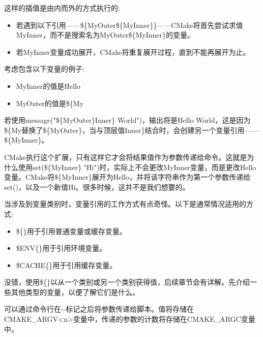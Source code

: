 这样的插值是由内而外的方式执行的:

\begin{itemize}
\item 
若遇到以下引用——\$\{MyOuter\$\{MyInner\}\}——CMake将首先尝试求值MyInner，而不是搜索名为MyOuter\$\{MyInner\}的变量。

\item 
若MyInner变量成功展开，CMake将重复展开过程，直到不能再展开为止。
\end{itemize}

考虑包含以下变量的例子:

\begin{itemize}
\item 
MyInner的值是Hello

\item 
MyOuter的值是\$\{My
\end{itemize}

若使用message("\$\{MyOuter\}Inner\} World")，输出将是Hello World，这是因为\$\{My替换了\$\{MyOuter\}，当与顶层值Inner\}结合时，会创建另一个变量引用——\$\{MyInner\}。

CMake执行这个扩展，只有这样它才会将结果值作为参数传递给命令。这就是为什么使用set(\$\{MyInner\} "Hi")时，实际上不会更改MyInner变量，而是更改Hello变量。CMake将\$\{MyInner\}展开为Hello，并将该字符串作为第一个参数传递给set()，以及一个新值Hi。很多时候，这并不是我们想要的。

当涉及到变量类别时，变量引用的工作方式有点奇怪。以下是通常情况适用的方式:

\begin{itemize}
\item 
\$\{\}用于引用普通变量或缓存变量。

\item 
\$ENV\{\}用于引用环境变量。

\item 
\$CACHE\{\}用于引用缓存变量。
\end{itemize}

没错，使用\$\{\}以从一个类别或另一个类别获得值，后续章节会有详解。先介绍一些其他类型的变量，以便了解它们是什么。

\begin{tcolorbox}[colback=blue!5!white,colframe=blue!75!black,title=Note]
可以通过命令行在-{}-标记之后将参数传递给脚本。值将存储在CMAKE\_ARGV<n>变量中，传递的参数的计数将存储在CMAKE\_ARGC变量中。
\end{tcolorbox}


